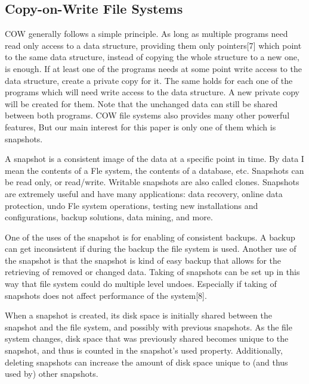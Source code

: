 \documentclass[12pt,twoside]{article}
\begin{document}
\subsection{Copy-on-Write File Systems}
COW generally follows a simple principle. As long as multiple programs need read only access to a data structure, providing them only pointers[7] which point to the same data structure, instead of copying the whole structure to a new one, is enough. If at least one of the programs needs at some point write access to the data structure, create a private copy for it. The same holds for each one of the programs which will need write access to the data structure. A new private copy will be created for them. Note that the unchanged data can still be shared between both programs. COW file systems also provides many other powerful features, But our main interest for this paper is only one of them which is snapshots.

A snapshot is a consistent image of the data at a specific point in time. By data I mean the contents of a Fle system, the contents of a database, etc. Snapshots can be read only, or read/write. Writable snapshots are also called clones. Snapshots are extremely useful and have many applications: data recovery, online data protection, undo Fle system operations, testing new installations and configurations, backup solutions, data mining, and more. 

One of the uses of the snapshot is for enabling of consistent backups. A backup can get inconsistent if during the backup the file system is used. Another use of the snapshot is that the snapshot is kind of easy backup that allows for the retrieving of removed or changed data. Taking of snapshots can be set up in this way that file system could do multiple level undoes. Especially if taking of snapshots does not affect performance of the system[8].

When a snapshot is created, its disk space is initially shared between the snapshot and the file system, and possibly with previous snapshots. As the file system changes, disk space that was previously shared becomes unique to the snapshot, and thus is counted in the snapshot's used property. Additionally, deleting snapshots can increase the amount of disk space unique to (and thus used by) other snapshots.
\end{document}
